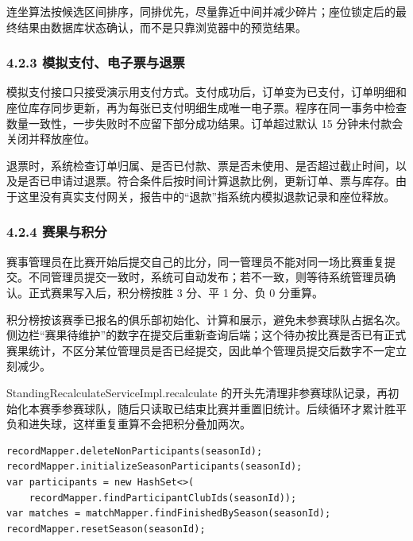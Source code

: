 \documentclass[UTF8,zihao=-4,a4paper]{ctexart}
\begin{document}
连坐算法按候选区间排序，同排优先，尽量靠近中间并减少碎片；座位锁定后的最终结果由数据库状态确认，而不是只靠浏览器中的预览结果。


\subsubsection*{4.2.3 模拟支付、电子票与退票}

模拟支付接口只接受演示用支付方式。支付成功后，订单变为已支付，订单明细和座位库存同步更新，再为每张已支付明细生成唯一电子票。程序在同一事务中检查数量一致性，一步失败时不应留下部分成功结果。订单超过默认 15 分钟未付款会关闭并释放座位。


退票时，系统检查订单归属、是否已付款、票是否未使用、是否超过截止时间，以及是否已申请过退票。符合条件后按时间计算退款比例，更新订单、票与库存。由于这里没有真实支付网关，报告中的“退款”指系统内模拟退款记录和座位释放。


\subsubsection*{4.2.4 赛果与积分}

赛事管理员在比赛开始后提交自己的比分，同一管理员不能对同一场比赛重复提交。不同管理员提交一致时，系统可自动发布；若不一致，则等待系统管理员确认。正式赛果写入后，积分榜按胜 3 分、平 1 分、负 0 分重算。


积分榜按该赛季已报名的俱乐部初始化、计算和展示，避免未参赛球队占据名次。侧边栏“赛果待维护”的数字在提交后重新查询后端；这个待办按比赛是否已有正式赛果统计，不区分某位管理员是否已经提交，因此单个管理员提交后数字不一定立刻减少。


StandingRecalculateServiceImpl.recalculate 的开头先清理非参赛球队记录，再初始化本赛季参赛球队，随后只读取已结束比赛并重置旧统计。后续循环才累计胜平负和进失球，这样重复重算不会把积分叠加两次。


\noindent\begin{minipage}{\linewidth}\small\begin{verbatim}
recordMapper.deleteNonParticipants(seasonId);
recordMapper.initializeSeasonParticipants(seasonId);
var participants = new HashSet<>(
    recordMapper.findParticipantClubIds(seasonId));
var matches = matchMapper.findFinishedBySeason(seasonId);
recordMapper.resetSeason(seasonId);
\end{verbatim}\end{minipage}\par
\end{document}
